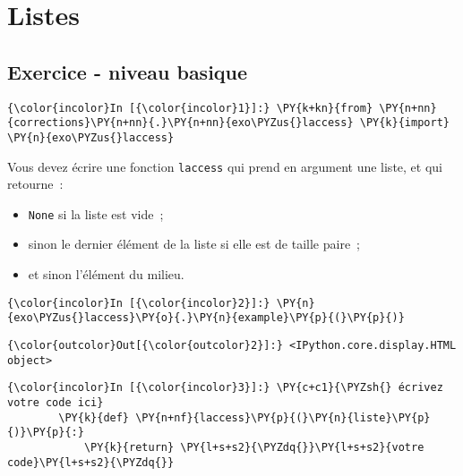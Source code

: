     
    
    
    

    

    \hypertarget{listes}{%
\section{Listes}\label{listes}}

    \hypertarget{exercice---niveau-basique}{%
\subsection{Exercice - niveau basique}\label{exercice---niveau-basique}}

    \begin{Verbatim}[commandchars=\\\{\},frame=single,framerule=0.3mm,rulecolor=\color{cellframecolor}]
{\color{incolor}In [{\color{incolor}1}]:} \PY{k+kn}{from} \PY{n+nn}{corrections}\PY{n+nn}{.}\PY{n+nn}{exo\PYZus{}laccess} \PY{k}{import} \PY{n}{exo\PYZus{}laccess}
\end{Verbatim}


    Vous devez écrire une fonction \texttt{laccess} qui prend en argument
une liste, et qui retourne~:

\begin{itemize}
\tightlist
\item
  \texttt{None} si la liste est vide~;
\item
  sinon le dernier élément de la liste si elle est de taille paire~;
\item
  et sinon l'élément du milieu.
\end{itemize}

    \begin{Verbatim}[commandchars=\\\{\},frame=single,framerule=0.3mm,rulecolor=\color{cellframecolor}]
{\color{incolor}In [{\color{incolor}2}]:} \PY{n}{exo\PYZus{}laccess}\PY{o}{.}\PY{n}{example}\PY{p}{(}\PY{p}{)}
\end{Verbatim}


\begin{Verbatim}[commandchars=\\\{\},frame=single,framerule=0.3mm,rulecolor=\color{cellframecolor}]
{\color{outcolor}Out[{\color{outcolor}2}]:} <IPython.core.display.HTML object>
\end{Verbatim}
            
    \begin{Verbatim}[commandchars=\\\{\},frame=single,framerule=0.3mm,rulecolor=\color{cellframecolor}]
{\color{incolor}In [{\color{incolor}3}]:} \PY{c+c1}{\PYZsh{} écrivez votre code ici}
        \PY{k}{def} \PY{n+nf}{laccess}\PY{p}{(}\PY{n}{liste}\PY{p}{)}\PY{p}{:}
            \PY{k}{return} \PY{l+s+s2}{\PYZdq{}}\PY{l+s+s2}{votre code}\PY{l+s+s2}{\PYZdq{}}
\end{Verbatim}


